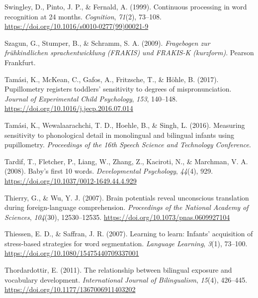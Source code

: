 \documentclass[
  12pt,
  b5paperpaper,
  twoside]{scrreprt}
\newlength{\cslhangindent}
\newlength{\cslentryspacingunit} %
\newenvironment{CSLReferences}[2] %
 {%
  \setlength{\parindent}{0pt}
  \ifodd #1
  \let\oldpar\par
  \def\par{\hangindent=\cslhangindent\oldpar}
  \fi
  \setlength{\parskip}{#2\cslentryspacingunit}
 }%
 {}
\begin{document}
\begin{CSLReferences}{1}{0}
\leavevmode{}%
Swingley, D., Pinto, J. P., \& Fernald, A. (1999). Continuous processing
in word recognition at 24 months. \emph{Cognition}, \emph{71}(2),
73--108. \url{https://doi.org/10.1016/s0010-0277(99)00021-9}

\leavevmode{}%
Szagun, G., Stumper, B., \& Schramm, S. A. (2009). \emph{Fragebogen zur
fr{ü}hkindlichen sprachentwicklung ({FRAKIS}) und {FRAKIS-K}
(kurzform)}. {Pearson Frankfurt}.

\leavevmode{}%
Tamási, K., McKean, C., Gafos, A., Fritzsche, T., \& Höhle, B. (2017).
Pupillometry registers toddlers' sensitivity to degrees of
mispronunciation. \emph{Journal of Experimental Child Psychology},
\emph{153}, 140--148. \url{https://doi.org/10.1016/j.jecp.2016.07.014}

\leavevmode{}%
Tamási, K., Wewalaarachchi, T. D., Hoehle, B., \& Singh, L. (2016).
Measuring sensitivity to phonological detail in monolingual and
bilingual infants using pupillometry. \emph{Proceedings of the 16th
{Speech Science} and {Technology Conference}}.

\leavevmode{}%
Tardif, T., Fletcher, P., Liang, W., Zhang, Z., Kaciroti, N., \&
Marchman, V. A. (2008). Baby's first 10 words. \emph{Developmental
Psychology}, \emph{44}(4), 929.
\url{https://doi.org/10.1037/0012-1649.44.4.929}

\leavevmode{}%
Thierry, G., \& Wu, Y. J. (2007). Brain potentials reveal unconscious
translation during foreign-language comprehension. \emph{Proceedings of
the National Academy of Sciences}, \emph{104}(30), 12530--12535.
\url{https://doi.org/10.1073/pnas.0609927104}

\leavevmode{}%
Thiessen, E. D., \& Saffran, J. R. (2007). Learning to learn: Infants'
acquisition of stress-based strategies for word segmentation.
\emph{Language Learning}, \emph{3}(1), 73--100.
\url{https://doi.org/10.1080/15475440709337001}

\leavevmode{}%
Thordardottir, E. (2011). The relationship between bilingual exposure
and vocabulary development. \emph{International Journal of
Bilingualism}, \emph{15}(4), 426--445.
\url{https://doi.org/10.1177/1367006911403202}


\end{CSLReferences}
\end{document}
